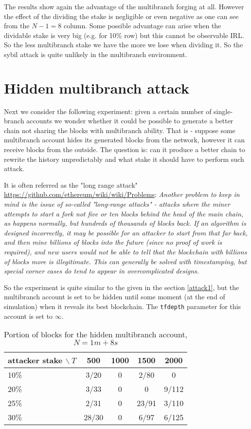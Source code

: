 \documentclass[12pt]{article}
\begin{document}
The results show again the advantage of the multibranch forging at all. However the effect of the dividing the stake
is negligible or even negative as one can see from the $N-1=8$ column. Some possible advantage can arise when the dividable
stake is very big (e.g. for 10\% row) but this cannot be observable IRL. So the less multibranch stake we have the more we lose
when dividing it. So the sybil attack is quite unlikely in the multibranch environment. 

\section{Hidden multibranch attack}

Next we consider the following experiment: given a certain number of single-branch accounts we wonder whether it could be possible to generate 
a better chain not sharing the blocks with multibranch ability. That is \-- suppose some multibranch account hides its generated blocks from the network, 
however it can receive blocks from the outside. The question is: can it produce a better chain to rewrite the history unpredictably and what 
stake it should have to perform such attack. 

It is often referred as the "long range attack" \url{https://github.com/ethereum/wiki/wiki/Problems}: {\it Another problem to keep in mind is the issue of so-called "long-range attacks" - attacks where the miner attempts to start a fork not five or ten blocks behind the head of the main chain, as happens normally, but hundreds of thousands of blocks back. If an algorithm is designed incorrectly, it may be possible for an attacker to start from that far back, and then mine billions of blocks into the future (since no proof of work is required), and new users would not be able to tell that the blockchain with billions of blocks more is illegitimate. This can generally be solved with timestamping, but special corner cases do tend to appear in overcomplicated designs.}

So the experiment is quite similar to the given in the section \ref{attack1}, but the multibranch account is set to be 
hidden until some moment (at the end of simulation) when it reveals its best blockchain. The \texttt{tfdepth} parameter for this account is set to $\infty$. 

\begin{table}[H]
\caption{Portion of blocks for the hidden multibranch account, $N=1m+8s$}
\begin{center}
\begin{tabular}{|l|c|c|c|c|}
\hline
attacker stake $\backslash\ T$ & 500 & 1000 & 1500 & 2000\\
\hline
10\% & 3/20 & 0 & 2/80 & 0\\
20\% & 3/33 & 0 & 0 & 9/112\\
25\% & 2/31 & 0 & 23/91 & 3/110 \\
30\% & 28/30 & 0 & 6/97 & 6/125 \\
\hline
\end{tabular}
\end{center}
\end{table}
\end{document}
